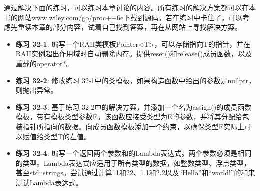 通过解决下面的练习，可以练习本章讨论的内容。所有练习的解决方案都可以在本书的网站\url{www.wiley.com/go/proc++6e}下载到源码。若在练习中卡住了，可以考虑先重读本章的部分内容，试着自己找到答案，再在从网站上寻找解决方案。

\begin{itemize}
\item
\textbf{练习 32-1}: 编写一个RAII类模板Pointer<T>，可以存储指向T的指针，并在RAII实例超出作用域时自动删除内存。提供reset()和release()成员函数，以及重载的operator*。

\item
\textbf{练习 32-2}: 修改练习 32-1中的类模板，如果构造函数中给出的参数是nullptr，则抛出异常。

\item
\textbf{练习 32-3}: 基于练习 32-2中的解决方案，并添加一个名为assign()的成员函数模板，带有模板类型参数E。该函数应接受类型为E的参数，并将其分配给包装指针所指向的数据。向成员函数模板添加一个约束，以确保类型E实际上可以赋值给类型T的左值。

\item
\textbf{练习 32-4}: 编写一个返回两个参数和的Lambda表达式。两个参数必须是相同的类型。Lambda表达式应适用于所有类型的数据，如整数类型、浮点类型，甚至std::strings。尝试通过计算11和22、1.1和2.2以及“Hello”和“world!”的和来测试Lambda表达式。
\end{itemize}
